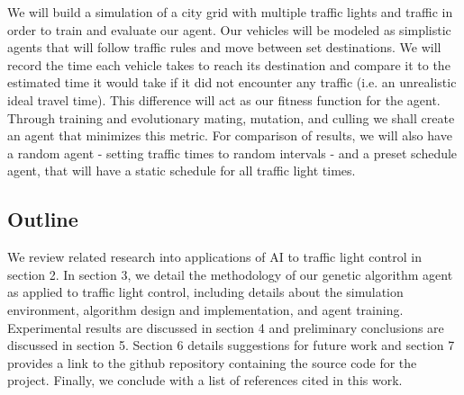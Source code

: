 \documentclass[twocolumn]{article}
\begin{document}
We will build a simulation of a city grid with multiple traffic lights and traffic in order to train and evaluate our agent. Our vehicles will be modeled as simplistic agents that will follow traffic rules and move between set destinations. We will record the time each vehicle takes to reach its destination and compare it to the estimated time it would take if it did not encounter any traffic (i.e. an unrealistic ideal travel time). This difference will act as our fitness function for the agent. Through training and evolutionary mating, mutation, and culling we shall create an agent that minimizes this metric.
For comparison of results, we will also have a random agent - setting traffic times to random intervals - and a preset schedule agent, that will have a static schedule for all traffic light times.

\subsection{Outline}

We review related research into applications of AI to traffic light control in section 2. In section 3, we detail the methodology of our genetic algorithm agent as applied to traffic light control, including details about the simulation environment, algorithm design and implementation, and agent training. Experimental results are discussed in section 4 and preliminary conclusions are discussed in section 5.  Section 6 details suggestions for future work and section 7 provides a link to the github repository containing the source code for the project. Finally, we conclude with a list of references cited in this work.
\end{document}
